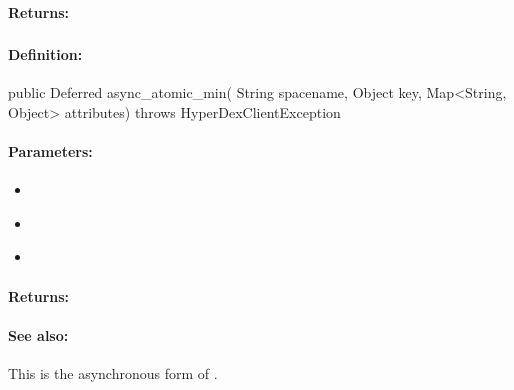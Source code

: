 \paragraph{Returns:}


\pagebreak
\subsubsection{}
\label{api:java:async_atomic_min}


\paragraph{Definition:}
\begin{javacode}
public Deferred async_atomic_min(
        String spacename,
        Object key,
        Map<String, Object> attributes) throws HyperDexClientException
\end{javacode}

\paragraph{Parameters:}
\begin{itemize}[noitemsep]
\item {}\\

\item {}\\

\item {}\\

\end{itemize}

\paragraph{Returns:}


\paragraph{See also:}  This is the asynchronous form of .

\pagebreak

